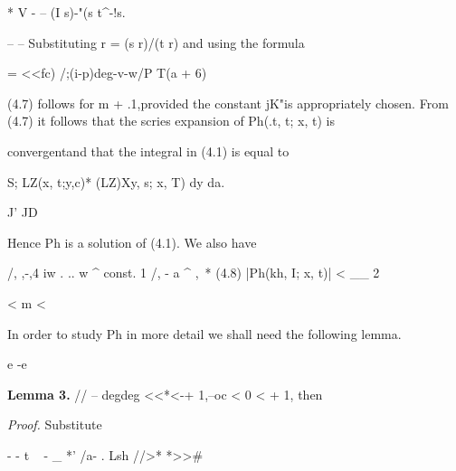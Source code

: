 \begin{ocrformula}
* V             -                 --
(I        s)-"(s           t^-^^as.
\end{ocrformula}

\begin{ocrformula}
--              --
Substituting            r =     (s        r)/(t             r) and         using        the formula
\end{ocrformula}

\begin{ocrformula}
= <<fc)
/;(i-p)deg-v-w/P                                  T(a +              6)
\end{ocrformula}

\begin{ocrformula}
(4.7) follows for m + .1,provided    the constant jK"is appropriately     chosen.
From    (4.7) it follows that the scries expansion  of Ph(.t, t; x, t) is
\end{ocrformula}

convergentand that the integral in (4.1) is equal to

\begin{ocrformula}
S;               LZ(x,        t;y,c)*        (LZ)Xy,            s; x, T) dy da.
\end{ocrformula}

J' JD

Hence Ph is a solution of (4.1). We also have

\begin{ocrformula}
/, ,-,4 iw    . .. w ^                    const.                           1                            /, -    a     ^       ,\ *
(4.8)   |Ph(kh, I; x, t)| <                                        __                                             2
\end{ocrformula}

< m <

\begin{ocrformula}
-{GZG^             |g        {|i,+2.2m_a                       ^1                    1J
\end{ocrformula}

In order to study Ph in more detail we shall need the following lemma.

e -e

\medskip\noindent\textbf{Lemma 3.} // -- degdeg <<*<-+ 1,--oc < 0 < + 1, then

\medskip\noindent\textit{Proof.} Substitute

\begin{ocrformula}
-                              -                           t ~                       -
_                               *'           /a-    .                         Lsh           //>* *>>#
\end{ocrformula}

